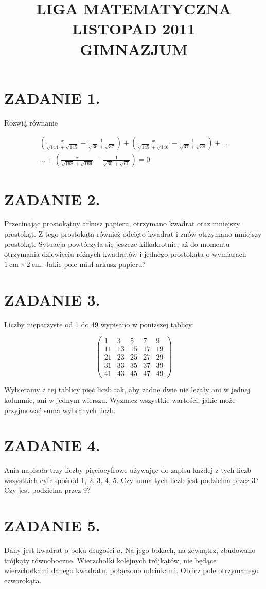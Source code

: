 \documentclass[10pt]{article}
\title{LIGA MATEMATYCZNA \\
 LISTOPAD 2011 \\
 GIMNAZJUM }
\author{}
\date{}
\begin{document}
\maketitle
\section*{ZADANIE 1.}
Rozwią̇̇ równanie

\[
\begin{gathered}
\left(\frac{x}{\sqrt{144}+\sqrt{145}}-\frac{1}{\sqrt{36}+\sqrt{37}}\right)+\left(\frac{x}{\sqrt{145}+\sqrt{146}}-\frac{1}{\sqrt{37}+\sqrt{38}}\right)+\ldots \\
\ldots+\left(\frac{x}{\sqrt{168}+\sqrt{169}}-\frac{1}{\sqrt{60}+\sqrt{61}}\right)=0
\end{gathered}
\]

\section*{ZADANIE 2.}
Przecinając prostokątny arkusz papieru, otrzymano kwadrat oraz mniejszy prostokąt. Z tego prostokąta również odcięto kwadrat i znów otrzymano mniejszy prostokąt. Sytuacja powtórzyła się jeszcze kilkakrotnie, aż do momentu otrzymania dziewięciu różnych kwadratów i jednego prostokąta o wymiarach \(1 \mathrm{~cm} \times 2 \mathrm{~cm}\). Jakie pole miał arkusz papieru?

\section*{ZADANIE 3.}
Liczby nieparzyste od 1 do 49 wypisano w poniższej tablicy:

\[
\left(\begin{array}{ccccc}
1 & 3 & 5 & 7 & 9 \\
11 & 13 & 15 & 17 & 19 \\
21 & 23 & 25 & 27 & 29 \\
31 & 33 & 35 & 37 & 39 \\
41 & 43 & 45 & 47 & 49
\end{array}\right)
\]

Wybieramy z tej tablicy pięć liczb tak, aby żadne dwie nie leżały ani w jednej kolumnie, ani w jednym wierszu. Wyznacz wszystkie wartości, jakie może przyjmować suma wybranych liczb.

\section*{ZADANIE 4.}
Ania napisała trzy liczby pięciocyfrowe używając do zapisu każdej z tych liczb wszystkich cyfr spośród 1, 2, 3, 4, 5. Czy suma tych liczb jest podzielna przez 3? Czy jest podzielna przez 9?

\section*{ZADANIE 5.}
Dany jest kwadrat o boku długości \(a\). Na jego bokach, na zewnątrz, zbudowano trójkąty równoboczne. Wierzchołki kolejnych trójkątów, nie będące wierzchołkami danego kwadratu, połączono odcinkami. Oblicz pole otrzymanego czworokąta.
\end{document}
